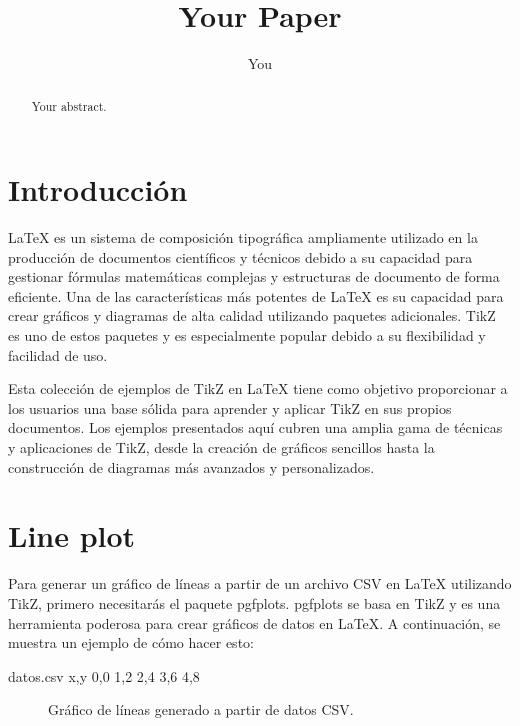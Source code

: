 \documentclass{article}
\title{Your Paper}
\author{You}
\begin{document}
\maketitle

\begin{abstract}
Your abstract.
\end{abstract}

\section{Introducción}
LaTeX es un sistema de composición tipográfica ampliamente utilizado en la producción de documentos científicos y técnicos debido a su capacidad para gestionar fórmulas matemáticas complejas y estructuras de documento de forma eficiente. Una de las características más potentes de LaTeX es su capacidad para crear gráficos y diagramas de alta calidad utilizando paquetes adicionales. TikZ es uno de estos paquetes y es especialmente popular debido a su flexibilidad y facilidad de uso.

Esta colección de ejemplos de TikZ en LaTeX tiene como objetivo proporcionar a los usuarios una base sólida para aprender y aplicar TikZ en sus propios documentos. Los ejemplos presentados aquí cubren una amplia gama de técnicas y aplicaciones de TikZ, desde la creación de gráficos sencillos hasta la construcción de diagramas más avanzados y personalizados.

\section{Line plot}
Para generar un gráfico de líneas a partir de un archivo CSV en LaTeX utilizando TikZ, primero necesitarás el paquete pgfplots. pgfplots se basa en TikZ y es una herramienta poderosa para crear gráficos de datos en LaTeX. A continuación, se muestra un ejemplo de cómo hacer esto:

\begin{filecontents*}{datos.csv}
x,y
0,0
1,2
2,4
3,6
4,8
\end{filecontents*}

\pgfplotsset{compat=1.17}

\begin{figure}[h!]
\centering
{}
\caption{Gráfico de líneas generado a partir de datos CSV.}
\end{figure}
\clearpage
\end{document}
